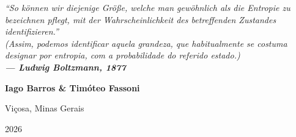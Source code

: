 \begin{titlepage}
    \vspace{2cm}

    \hfill\begin{minipage}[c][2cm][c]{13cm}
    \begin{flushright}
       \small\itshape
        ``So können wir diejenige Größe, welche man gewöhnlich als die Entropie zu bezeichnen pflegt, mit der Wahrscheinlichkeit des betreffenden Zustandes identifizieren.''\\[0.15cm]
        \color{black!75}\footnotesize
        (Assim, podemos identificar aquela grandeza, que habitualmente se costuma designar por entropia, com a probabilidade do referido estado.)\\[0.15cm]
        \raggedleft \color{black}\normalfont\bfseries --- Ludwig Boltzmann, 1877
    \end{flushright}
    \end{minipage}
        
    \vspace*{\fill} 

    {\Large\bfseries Iago Barros \& Timóteo Fassoni\par}
    \vspace{0.6cm}
    {\large Viçosa, Minas Gerais\par
    2026\par}
    
    \vspace*{1cm}
\end{titlepage}